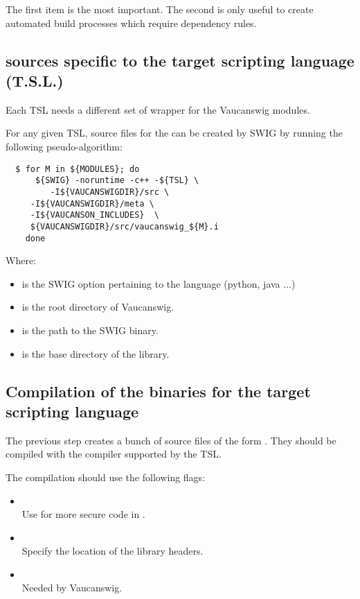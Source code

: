The first item is the most important. The second is only useful to create
automated build processes which require dependency rules.


\subsection{\CxxHR sources specific to the target scripting language (T.S.L.)}

Each TSL needs a different set of wrapper for the Vaucanswig modules.

For any given TSL, source files for the  can be created by
SWIG by running the following pseudo-algorithm:

\begin{lstlisting}
  $ for M in ${MODULES}; do
      ${SWIG} -noruntime -c++ -${TSL} \
         -I${VAUCANSWIGDIR}/src \
	 -I${VAUCANSWIGDIR}/meta \
	 -I${VAUCANSON_INCLUDES}  \
 	 ${VAUCANSWIGDIR}/src/vaucanswig_${M}.i
    done
\end{lstlisting}%

Where:

\begin{itemize}
\item {} is the SWIG option pertaining to the language
  (python, java ...)
\item {} is the root directory of Vaucanswig.
\item {} is the path to the SWIG binary.
\item \code{\$\{VAUCANSON\_INCLUDES\}} is the base directory of the
  \Vauc library.
\end{itemize}

\subsection{Compilation of the binaries for the target scripting language}

The previous step creates a bunch of \Cxx source files of the form
. They should be compiled with the
\Cxx compiler supported by the TSL.

The \Cxx compilation should use the following flags:

\begin{itemize}
\item {}\\
  Use for more secure code in \Vauc.

\item {}\\
  Specify the location of the \Vauc library headers.

\item {}\\
  Needed by Vaucanswig.
\end{itemize}

